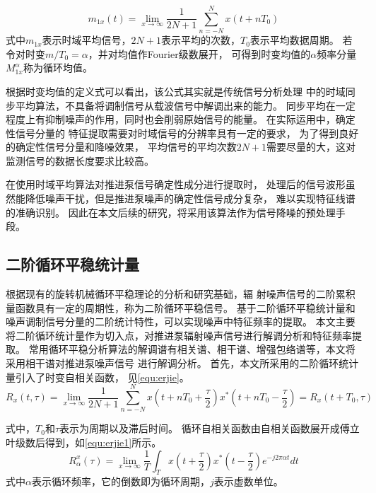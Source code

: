 \begin{equation}
    \label{equ:yijie}
    m_{1x} \left ( t \right ) =\lim_{x \to \infty} \frac{1}{2N+1}\sum_{n=-N}^{N}x\left ( t+nT_{0}  \right )   
\end{equation}
式中$m_{1x}$表示时域平均信号，$2N+1$表示平均的次数，$T_{0}$表示平均数据周期。
若令对时变$m/T_{0} =\alpha$，并对均值作Fourier级数展开，
可得到时变均值的$\alpha$频率分量$M_{1x}^{\alpha}$称为循环均值。

根据时变均值的定义式可以看出，该公式其实就是传统信号分析处理
中的时域同步平均算法，不具备将调制信号从载波信号中解调出来的能力。
同步平均在一定程度上有抑制噪声的作用，同时也会削弱原始信号的能量。
在实际运用中，确定性信号分量的
特征提取需要对时域信号的分辨率具有一定的要求，
为了得到良好的确定性信号分量和降噪效果，
平均信号的平均次数$2N+1$需要尽量的大，这对监测信号的数据长度要求比较高\cite{陈进2013机械故障特征提取的循环平稳理论及方法}。

在使用时域平均算法对推进泵信号确定性成分进行提取时，
处理后的信号波形虽然能降低噪声干扰，但是推进泵噪声的确定性信号成分复杂，
难以实现特征线谱的准确识别。
因此在本文后续的研究，将采用该算法作为信号降噪的预处理手段。

\subsection{二阶循环平稳统计量}
根据现有的旋转机械循环平稳理论的分析和研究基础，辐
射噪声信号的二阶累积量函数具有一定的周期性，称为二阶循环平稳信号。
基于二阶循环平稳统计量和噪声调制信号分量的二阶统计特性，可以实现噪声中特征频率的提取。
本文主要将二阶循环统计量作为切入点，对推进泵辐射噪声信号进行解调分析和特征频率提取。
常用循环平稳分析算法的解调谱有相关谱、相干谱、增强包络谱等，本文将采用相干谱对推进泵噪声信号
进行解调分析。
首先，本文所采用的二阶循环统计量引入了时变自相关函数，
见\autoref{equ:erjie}。 
\begin{equation}
    \label{equ:erjie}
    R_{x} \left ( t,\tau  \right ) =\lim_{x \to \infty} \frac{1}{2N+1} \sum_{n=-N}^{N} x\left ( t+nT_0+\frac{\tau }{2}  \right )x^{\ast }\left ( t+nT_0-\frac{\tau }{2}  \right )=R_{x}\left ( t+T_0,\tau  \right )    
\end{equation}

式中，$T_0$和$\tau$表示为周期以及滞后时间。
循环自相关函数由自相关函数展开成傅立叶级数后得到，如\autoref{equ:erjie1}所示。
\begin{equation}
    \label{equ:erjie1}
    R_{\alpha }^{x} \left ( \tau  \right ) =\lim_{x \to \infty} \frac{1}{T}\int_{T}^{}x\left ( t+\frac{\tau }{2}  \right )x^{\ast } \left ( t-\frac{\tau }{2} \right ) e^{-j2\pi \alpha t} dt   
\end{equation}
式中$\alpha$表示循环频率，它的倒数即为循环周期，$j$表示虚数单位。

